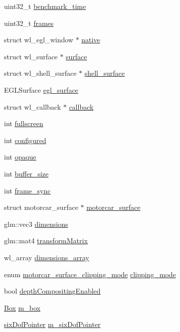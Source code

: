 \begin{DoxyCompactItemize}
\begin{tabbing}
\end{tabbing}\item 
uint32\-\_\-t \hyperlink{structwindow_a72629bf021a361ad900504732a74cb68}{benchmark\-\_\-time}
\item 
uint32\-\_\-t \hyperlink{structwindow_a633864bb495ec265bee220a5c70cc98f}{frames}
\item 
struct wl\-\_\-egl\-\_\-window $\ast$ \hyperlink{structwindow_ae41be0955d0e73530e1bc13dfeb9d731}{native}
\item 
struct wl\-\_\-surface $\ast$ \hyperlink{structwindow_a7d0790cfc7c30621611fa26ab5c1ae97}{surface}
\item 
struct wl\-\_\-shell\-\_\-surface $\ast$ \hyperlink{structwindow_ae4cdc06e4406bc9c168e4a71dcba1103}{shell\-\_\-surface}
\item 
E\-G\-L\-Surface \hyperlink{structwindow_a8de0059f3f1cb0dec33fba1143b7dee1}{egl\-\_\-surface}
\item 
struct wl\-\_\-callback $\ast$ \hyperlink{structwindow_a35ba639556fa19d9273dad0953a6807e}{callback}
\item 
int \hyperlink{structwindow_a8da44798a9e1feb7ed3fbd18ec3a28b6}{fullscreen}
\item 
int \hyperlink{structwindow_af6882ef635ac761ba3f211dabe1db108}{configured}
\item 
int \hyperlink{structwindow_a026a50808d8323a5a73d585c19916fa8}{opaque}
\item 
int \hyperlink{structwindow_a0e634038f669aff472012f25ea250b40}{buffer\-\_\-size}
\item 
int \hyperlink{structwindow_a851bcb65083f5ab5ff768b09522bed70}{frame\-\_\-sync}
\item 
struct motorcar\-\_\-surface $\ast$ \hyperlink{structwindow_a0be16829aad611ea0be83bd985b07302}{motorcar\-\_\-surface}
\item 
glm\-::vec3 \hyperlink{structwindow_a1790dd89351438799553877963c9b9ab}{dimensions}
\item 
glm\-::mat4 \hyperlink{structwindow_a2911655817f3e9ec91cd489d36712f9b}{transform\-Matrix}
\item 
wl\-\_\-array \hyperlink{structwindow_ad3edb12389ce7743cf7f976df301ed79}{dimensions\-\_\-array}
\item 
enum \hyperlink{motorcar-client-protocol_8h_a4609d9d55b9d8b4d07c8dd85fa4ec19d}{motorcar\-\_\-surface\-\_\-clipping\-\_\-mode} \hyperlink{structwindow_afd815498a7d31f3547853444970a3791}{clipping\-\_\-mode}
\item 
bool \hyperlink{structwindow_ab87d188c520d806331340e342bc9ffa1}{depth\-Compositing\-Enabled}
\item 
\hyperlink{classBox}{Box} \hyperlink{structwindow_a6947fe5efd08a769ede64d055eebd53b}{m\-\_\-box}
\item 
\hyperlink{classsixDofPointer}{six\-Dof\-Pointer} \hyperlink{structwindow_a3c4d0082f20f0df80dac6b0286451fcd}{m\-\_\-six\-Dof\-Pointer}
\end{DoxyCompactItemize}


